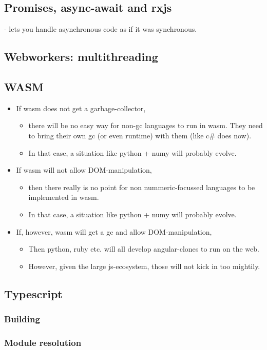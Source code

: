 \subsection{Promises, async-await and rxjs}
 -  lets you handle asynchronous code as if it was synchronous. 

\subsection{Webworkers: multithreading}


\subsection{WASM}
\begin{itemize}
    \item If wasm does not get a garbage-collector, 
        \begin{itemize}
            \item there will be no easy way for non-gc languages to run in wasm. They need to bring their own gc (or even runtime) with them (like c\# does now). 
            \item In that case, a situation like python + numy will probably evolve.
        \end{itemize}
    \item If wasm will not allow DOM-manipulation, 
        \begin{itemize}
            \item then there really is no point for non nummeric-focussed languages to be implemented in wasm.
            \item In that case, a situation like python + numy will probably evolve.
        \end{itemize}
    \item If, however, wasm will get a gc and allow DOM-manipulation, 
        \begin{itemize}
            \item Then python, ruby etc. will all develop angular-clones to run on the web. 
            \item However, given the large js-ecosystem, those will not kick in too mightily. 
        \end{itemize}
\end{itemize}

\subsection{Typescript}

\subsubsection{Building}

\subsubsection{Module resolution}